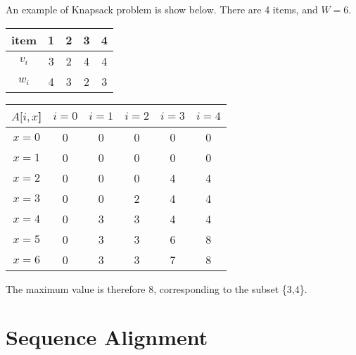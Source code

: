 An example of Knapsack problem is show below. There are 4 items, and $W = 6$. 
\begin{center}
\begin{tabular}{c|cccc}
item  & 1 & 2 & 3 & 4\\\hline
$v_i$ & 3 & 2 & 4 & 4\\
$w_i$ & 4 & 3 & 2 & 3\\
\end{tabular}
\begin{tabular}{c|ccccc}
$A[i,x$]& $i=0$ & $i=1$ & $i=2$ & $i=3$ & $i=4$\\\hline
$x=0$   &	0   & 0     & 0     & 0     & 0\\
$x=1$   &	0   & 0     & 0     & 0     & 0\\
$x=2$   &	0   & 0     & 0     & 4     & 4\\
$x=3$   &	0   & 0     & 2     & 4     & 4\\
$x=4$   &	0   & 3     & 3     & 4     & 4\\
$x=5$   &	0   & 3     & 3     & 6     & 8\\
$x=6$   &	0   & 3     & 3     & 7     & 8\\
\end{tabular}
\end{center}

The maximum value is therefore 8, corresponding to the subset \{3,4\}.
\section{Sequence Alignment}
\ifx\PREAMBLE\undefined

\fi